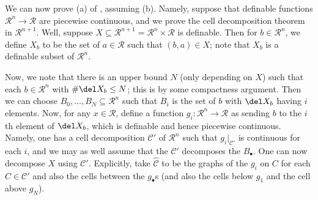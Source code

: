 \documentclass[../notes.tex]{subfiles}
\begin{document}
We can now prove (a) of , assuming (b). Namely, suppose that definable functions $\mathcal R^n\to\mathcal R$ are piecewise continuous, and we prove the cell decomposition theorem in $\mathcal R^{n+1}$. Well, suppose $X\subseteq\mathcal R^{n+1}=\mathcal R^n\times\mathcal R$ is definable. Then for $b\in\mathcal R^n$, we define $X_b$ to be the set of $a\in\mathcal R$ such that $(b,a)\in X$; note that $X_b$ is a definable subset of $\mathcal R^n$.

Now, we note that there is an upper bound $N$ (only depending on $X$) such that each $b\in\mathcal R^n$ with $\#\del X_b\le N$; this is by some compactness argument. Then we can choose $B_0,\ldots,B_N\subseteq\mathcal R^n$ such that $B_i$ is the set of $b$ with $\del X_b$ having $i$ elements. Now, for any $x\in\mathcal R$, define a function $g_i\colon\mathcal R^n\to\mathcal R$ as sending $b$ to the $i$th element of $\del X_b$, which is definable and hence piecewise continuous. Namely, one has a cell decomposition $\mathcal C'$ of $\mathcal R^n$ such that $g_i|_{\mathcal C'}$ is continuous for each $i$, and we may as well assume that the $\mathcal C'$ decomposes the $B_\bullet$. One can now decompose $X$ using $\mathcal C'$. Explicitly, take $\widehat{\mathcal C}$ to be the graphs of the $g_i$ on $C$ for each $C\in\mathcal C'$ and also the cells between the $g_\bullet$s (and also the cells below $g_1$ and the cell above $g_N$).
\end{document}
